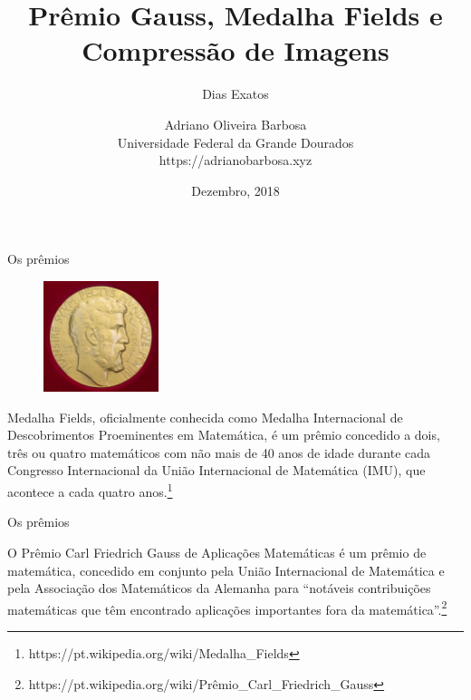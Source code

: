 \documentclass{beamer}
\author[Adriano Barbosa]{Adriano Oliveira Barbosa\\
Universidade Federal da Grande Dourados\\
https://adrianobarbosa.xyz}
\title{Pr\^emio Gauss, Medalha Fields e Compress\~ao de Imagens}
\subtitle[Dias Exatos]{Dias Exatos}
\date{Dezembro, 2018}
\begin{document}
\begin{frame}
	\maketitle
\end{frame}

\begin{frame}{Os pr\^emios}
    \begin{figure}
        \centering
        \includegraphics[width=0.3\textwidth]{figs/fields.jpg}
    \end{figure}
    \begin{center}
    Medalha Fields, oficialmente conhecida como Medalha Internacional de
    Descobrimentos Proeminentes em Matem\'atica, \'e um pr\^emio concedido a dois,
    tr\^es ou quatro matem\'aticos com n\~ao mais de 40 anos de idade durante cada
    Congresso Internacional da Uni\~ao Internacional de Matem\'atica (IMU), que
    acontece a cada quatro
    anos.\footnote{https://pt.wikipedia.org/wiki/Medalha\_Fields}
    \end{center}
\end{frame}

\begin{frame}{Os pr\^emios}
    \begin{center}
    O Pr\^emio Carl Friedrich Gauss de Aplica\c{c}\~oes Matem\'aticas \'e um pr\^emio de
    matem\'atica, concedido em conjunto pela Uni\~ao Internacional de Matem\'atica e
    pela Associa\c{c}\~ao dos Matem\'aticos da Alemanha para ``not\'aveis contribui\c{c}\~oes
    matem\'aticas que t\^em encontrado aplica\c{c}\~oes importantes fora da
    matem\'atica''.\footnote{https://pt.wikipedia.org/wiki/Pr\^emio\_Carl\_Friedrich\_Gauss}
    \end{center}
\end{frame}
\end{document}
